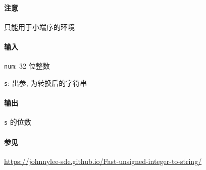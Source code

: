 \paragraph{注意}

只能用于小端序的环境

\paragraph{输入}

\verb|num|: 32 位整数

\verb|s|: 出参, 为转换后的字符串

\paragraph{输出}

\verb|s| 的位数

\paragraph{参见}

\url{https://johnnylee-sde.github.io/Fast-unsigned-integer-to-string/}
